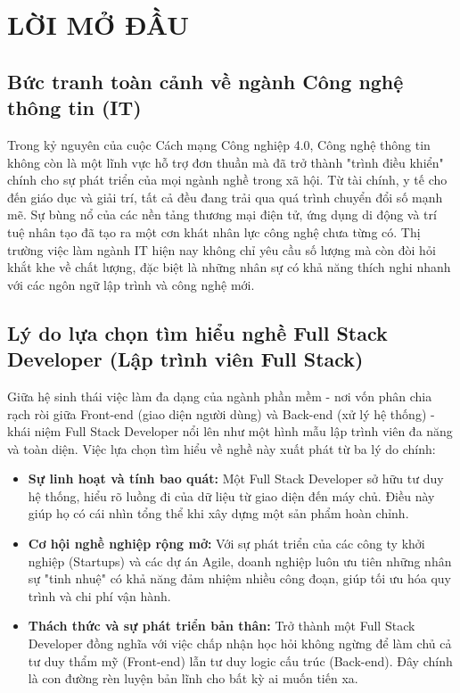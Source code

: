 \documentclass[12pt,a4paper]{article}
\begin{document}
\onehalfspacing

\section{LỜI MỞ ĐẦU}

\subsection{Bức tranh toàn cảnh về ngành Công nghệ thông tin (IT)}
\hspace{1cm}Trong kỷ nguyên của cuộc Cách mạng Công nghiệp 4.0, Công nghệ thông tin không còn là một lĩnh vực hỗ trợ đơn thuần mà đã trở thành "trình điều khiển" chính cho sự phát triển của mọi ngành nghề trong xã hội. Từ tài chính, y tế cho đến giáo dục và giải trí, tất cả đều đang trải qua quá trình chuyển đổi số mạnh mẽ. Sự bùng nổ của các nền tảng thương mại điện tử, ứng dụng di động và trí tuệ nhân tạo đã tạo ra một cơn khát nhân lực công nghệ chưa từng có. Thị trường việc làm ngành IT hiện nay không chỉ yêu cầu số lượng mà còn đòi hỏi khắt khe về chất lượng, đặc biệt là những nhân sự có khả năng thích nghi nhanh với các ngôn ngữ lập trình và công nghệ mới.

\subsection{Lý do lựa chọn tìm hiểu nghề Full Stack Developer (Lập trình viên Full Stack)}
\hspace{0.7cm}Giữa hệ sinh thái việc làm đa dạng của ngành phần mềm - nơi vốn phân chia rạch ròi giữa Front-end (giao diện người dùng) và Back-end (xử lý hệ thống) - khái niệm Full Stack Developer nổi lên như một hình mẫu lập trình viên đa năng và toàn diện. Việc lựa chọn tìm hiểu về nghề này xuất phát từ ba lý do chính:

\begin{itemize}
    \item \textbf{Sự linh hoạt và tính bao quát:} Một Full Stack Developer sở hữu tư duy hệ thống, hiểu rõ luồng đi của dữ liệu từ giao diện đến máy chủ. Điều này giúp họ có cái nhìn tổng thể khi xây dựng một sản phẩm hoàn chỉnh.
    \item \textbf{Cơ hội nghề nghiệp rộng mở:} Với sự phát triển của các công ty khởi nghiệp (Startups) và các dự án Agile, doanh nghiệp luôn ưu tiên những nhân sự "tinh nhuệ" có khả năng đảm nhiệm nhiều công đoạn, giúp tối ưu hóa quy trình và chi phí vận hành.
    \item \textbf{Thách thức và sự phát triển bản thân:} Trở thành một Full Stack Developer đồng nghĩa với việc chấp nhận học hỏi không ngừng để làm chủ cả tư duy thẩm mỹ (Front-end) lẫn tư duy logic cấu trúc (Back-end). Đây chính là con đường rèn luyện bản lĩnh cho bất kỳ ai muốn tiến xa.
\end{itemize}
\end{document}
